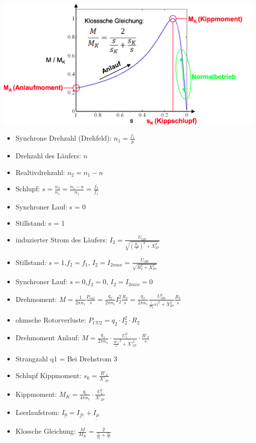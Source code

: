 \begin{minipage}{0.4 \linewidth}
\includegraphics[width = \linewidth]{./Pics/VL1213/Funktion4}
\end{minipage}
\begin{minipage}{0.6 \linewidth}
\begin{itemize}
\item Synchrone Drehzahl (Drehfeld): $n_1 = \frac{f_1}{p}$
\item Drehzahl des Läufers: $n$
\item Realtivdrehzahl: $n_2 = n_1 - n$
\item Schlupf: $s = \frac{n_2}{n_1} = \frac{n_1-n}{n_1} = \frac{f_2}{f_1}$
\item Synchroner Lauf: s = 0
\item Stillstand: s = 1
\item induzierter Strom des Läufers: $I_2 = \frac{U_{i20}}{\sqrt{(\frac{R_2}{s})^2 + X_{2\sigma}^2}}$
\item Stillstand: $s = 1$,$f_2 = f_1$, $I_2 = I_{2max} = \frac{U_{i20}}{\sqrt{R_2^2 + X_{2\sigma}^2}}$
\item Synchroner Lauf: $s = 0$,$f_2 = 0$, $I_2 = I_{2min} = 0$
\item Drehmoment: $M = \frac{1}{2\pi n_1} \frac{P_{cu2}}{s} = \frac{q_2}{2\pi n_1} I_2^2 \frac{R_2}{s} = \frac{q_2}{2 \pi n_1} \frac{U_{i20}^2}{\frac({R_2}{s})^2 + X_{2\sigma}^2} \frac{R_2}{s}$
\item ohmsche Rotorverluste: $P_{CU2} = q_2 \cdot I_2^2 \cdot R_2$
\item Drehmoment Anlauf: $M = \frac{q_1}{2 \pi n_1} \cdot \frac{U_1^2}{\frac{R'_2}{s}^2 + X'^2_{2\sigma}} \cdot \frac{R'_2}{s}$
\item Strangzahl q1 = Bei Drehstrom 3
\item Schlupf Kippmoment: $s_k = \frac{R'_2}{X'_{2\sigma}}$
\item Kippmoment: $M_K = \frac{q_1}{4\pi n_1} \cdot \frac{U_1^2}{X'_{2\sigma}}$
\item Leerlaufstrom: $\underline{I_0} = \underline{I_{fe}} + \underline{I_\mu}$
\item Klossche Gleichung: $\frac{M}{M_K} = \frac{2}{\frac{s}{s_k} + \frac{s_k}{s}}$
\end{itemize}
\end{minipage}

